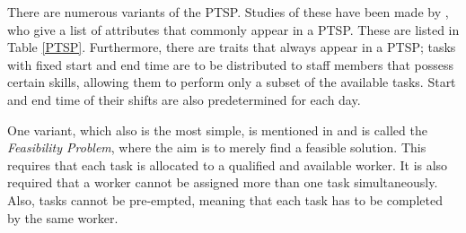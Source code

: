 There are numerous variants of the PTSP. Studies of these have been made by \citet{krishnamoorthy_2001}, who give a list of attributes that commonly appear in a PTSP. These are listed in Table \ref{PTSP}. Furthermore, there are traits that always appear in a PTSP; tasks with fixed start and end time are to be distributed to staff members that possess certain skills, allowing them to perform only a subset of the available tasks. Start and end time of their shifts are also predetermined for each day.

One variant, which also is the most simple, is mentioned in \citet{krishnamoorthy_2001} and is called the \textit{Feasibility Problem}, where the aim is to merely find a feasible solution. This requires that each task is allocated to a qualified and available worker. It is also required that a worker cannot be assigned more than one task simultaneously. Also, tasks cannot be pre-empted, meaning that each task has to be completed by the same worker.

